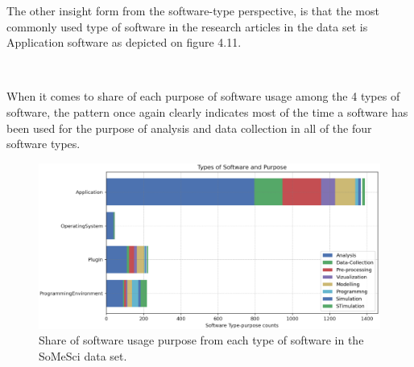 The other insight form from  the software-type perspective, is that the most commonly used type of software in the research articles in the data set is Application software as depicted on figure 4.11. \\

\begin{figure}[h]
	\myfloatalign
	 \quad
	 \\
	\caption[Subfloat - Figure]{}
	
\end{figure}


When it comes to share of each purpose of software usage among the 4 types of software, the pattern once again clearly indicates most of the time a software has been used for the purpose of analysis and data collection in all of the four software types. \\

\begin{figure}[htbp]
	\centering
	\includegraphics[width=1\textwidth]{4.graphics/figures/ch_4/analysisresults/6.Types of Software and Purpose stacked bar}
	\caption{Share of software usage purpose from each type of software in the \ac{SoMeSci} data set.}
	\label{fig:chapter03:setup}
\end{figure}

